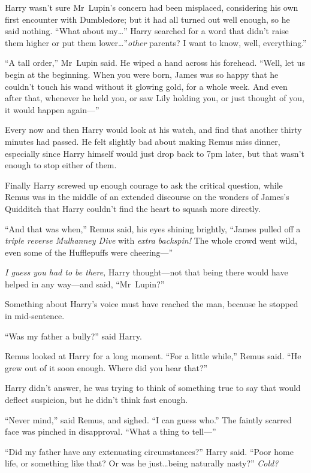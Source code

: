 Harry wasn’t sure Mr~Lupin’s concern had been misplaced, considering his own
first encounter with Dumbledore; but it had all turned out well enough, so he
said nothing. “What about my…” Harry searched for a word that didn’t
raise them higher or put them lower…”\emph{other} parents? I want to
know, well, everything.”

“A tall order,” Mr~Lupin said. He wiped a hand across his forehead. “Well, let
us begin at the beginning. When you were born, James was so happy that he
couldn’t touch his wand without it glowing gold, for a whole week. And even
after that, whenever he held you, or saw Lily holding you, or just thought of
you, it would happen again—”

\later

Every now and then Harry would look at his watch, and find that another thirty
minutes had passed. He felt slightly bad about making Remus miss dinner,
especially since Harry himself would just drop back to 7pm later, but that
wasn’t enough to stop either of them.

Finally Harry screwed up enough courage to ask the critical question, while
Remus was in the middle of an extended discourse on the wonders of James’s
Quidditch that Harry couldn’t find the heart to squash more directly.

“And that was when,” Remus said, his eyes shining brightly, “James pulled off a
\emph{triple reverse Mulhanney Dive} with \emph{extra backspin!} The whole
crowd went wild, even some of the Hufflepuffs were cheering—”

\emph{I guess you had to be there,} Harry thought—not that being there would
have helped in any way—and said, “Mr~Lupin?”

Something about Harry’s voice must have reached the man, because he stopped in
mid-sentence.

“Was my father a bully?” said Harry.

Remus looked at Harry for a long moment. “For a little while,” Remus said. “He
grew out of it soon enough. Where did you hear that?”

Harry didn’t answer, he was trying to think of something true to say that would
deflect suspicion, but he didn’t think fast enough.

“Never mind,” said Remus, and sighed. “I can guess who.” The faintly scarred
face was pinched in disapproval. “What a thing to tell—”

“Did my father have any extenuating circumstances?” Harry said. “Poor home
life, or something like that? Or was he just…being naturally
nasty?” \emph{Cold?}

